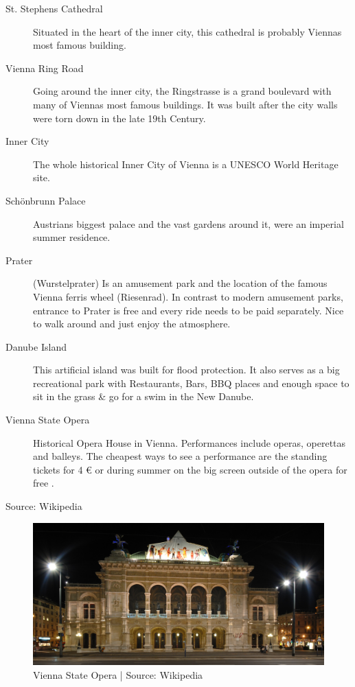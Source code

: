 \documentclass[10pt,a4paper]{article}
\begin{document}
\begin{description}
\item[\color{kdedarker} St. Stephens Cathedral] Situated in the heart of the inner city, this cathedral is probably Viennas most famous building.
\item[\color{kdedarker} Vienna Ring Road] Going around the inner city, the Ringstrasse is a grand boulevard with many of Viennas most famous buildings. It was built after the city walls were torn down in the late 19th Century.
\item[\color{kdedarker} Inner City] The whole historical Inner City of Vienna is a UNESCO World Heritage site.
\item[\color{kdedarker} Schönbrunn Palace] Austrians biggest palace and the vast gardens around it, were an imperial summer residence.
\item[\color{kdedarker} Prater] (Wurstelprater) Is an amusement park and the location of the famous Vienna ferris wheel (Riesenrad). In contrast to modern amusement parks, entrance to Prater is free and every ride needs to be paid separately. Nice to walk around and just enjoy the atmosphere.
\item[\color{kdedarker} Danube Island] This artificial island was built for flood protection. It also serves as a big recreational park with Restaurants, Bars, BBQ places and enough space to sit in the grass \& go for a swim in the New Danube.
\item[\color{kdedarker} Vienna State Opera] Historical Opera House in Vienna. Performances include operas, operettas and balleys. The cheapest ways to see a performance are the standing tickets for 4 \euro{} or during summer on the big screen outside of the opera for free .
\end{description}

{\footnotesize{Source: Wikipedia}}\\


\begin{figure}[ht]
\begin{center}
\includegraphics[width=\textwidth]{opera_vienna.jpg}
\footnotesize{Vienna State Opera | Source: Wikipedia}
\end{center}
\end{figure}
\end{document}
